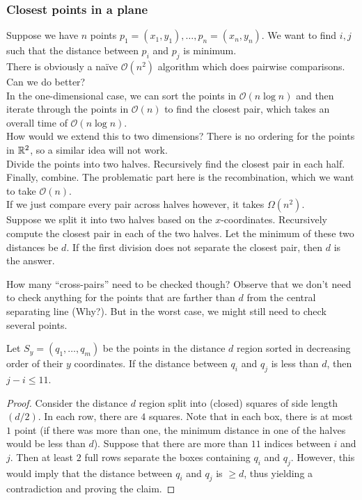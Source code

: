 \subsubsection{Closest points in a plane}
\label{subsubsec: closest points in a plane}

Suppose we have $n$ points $p_1=(x_1,y_1),\ldots,p_n=(x_n,y_n)$. We want to find $i,j$ such that the distance between $p_i$ and $p_j$ is minimum.\\

There is obviously a na\"ive $\mathcal{O}(n^2)$ algorithm which does pairwise comparisons. Can we do better?\\

In the one-dimensional case, we can sort the points in $\mathcal{O}(n\log n)$ and then iterate through the points in $\mathcal{O}(n)$ to find the closest pair, which takes an overall time of $\mathcal{O}(n\log n)$.\\
How would we extend this to two dimensions? There is no ordering for the points in $\mathbb{R}^2$, so a similar idea will not work.\\

Divide the points into two halves. Recursively find the closest pair in each half. Finally, combine. The problematic part here is the recombination, which we want to take $\mathcal{O}(n)$.\\
If we just compare every pair across halves however, it takes $\Omega(n^2)$.\\

Suppose we split it into two halves based on the $x$-coordinates. Recursively compute the closest pair in each of the two halves. Let the minimum of these two distances be $d$. If the first division does not separate the closest pair, then $d$ is the answer.

How many ``cross-pairs'' need to be checked though? Observe that we don't need to check anything for the points that are farther than $d$ from the central separating line (Why?). But in the worst case, we might still need to check several points.

\begin{lemma*}
	Let $S_y=(q_1,\ldots,q_m)$ be the points in the distance $d$ region sorted in decreasing order of their $y$ coordinates. If the distance between $q_i$ and $q_j$ is less than $d$, then $j-i\leq 11$.
\end{lemma*}
\begin{proof}
	Consider the distance $d$ region split into (closed) squares of side length $(d/2)$. In each row, there are $4$ squares. Note that in each box, there is at most $1$ point (if there was more than one, the minimum distance in one of the halves would be less than $d$). Suppose that there are more than $11$ indices between $i$ and $j$. Then at least $2$ full rows separate the boxes containing $q_i$ and $q_j$. However, this would imply that the distance between $q_i$ and $q_j$ is $\geq d$, thus yielding a contradiction and proving the claim.
\end{proof}

